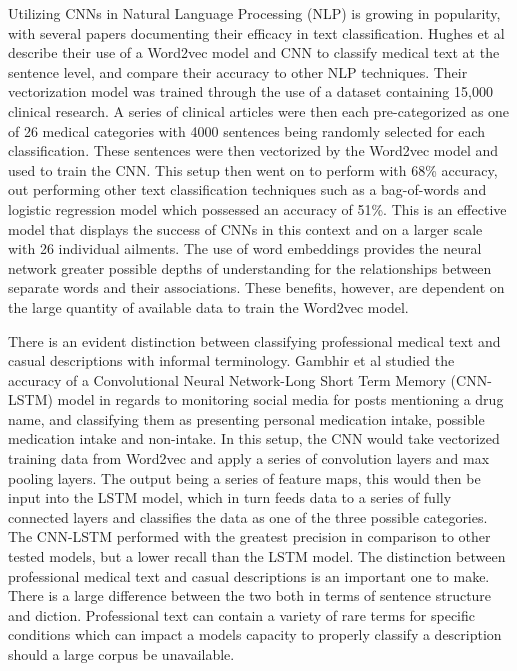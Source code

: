 \documentclass[12pt]{report}
\begin{document}
Utilizing CNNs in Natural Language Processing (NLP) is growing in popularity,
with several papers documenting their efficacy in text classification. Hughes
et al describe their use of a Word2vec model and CNN to classify medical text
at the sentence level, and compare their accuracy to other NLP techniques.
Their vectorization model was trained through the use of a dataset containing
15,000 clinical research. A series of clinical articles were then each
pre-categorized as one of 26 medical categories with 4000 sentences being
randomly selected for each classification. These sentences were then vectorized
by the Word2vec model and used to train the CNN. This setup then went on to
perform with 68\% accuracy, out performing other text classification techniques
such as a bag-of-words and logistic regression model which possessed an
accuracy of 51\%. This is an effective model that displays the success of CNNs
in this context and on a larger scale with 26 individual ailments. The use of
word embeddings provides the neural network greater possible depths of
understanding for the relationships between separate words and their
associations. These benefits, however, are dependent on the large quantity of
available data to train the Word2vec model.

There is an evident distinction between classifying professional medical text
and casual descriptions with informal terminology. Gambhir et al studied the
accuracy of a Convolutional Neural Network-Long Short Term Memory (CNN-LSTM)
model in regards to monitoring social media for posts mentioning a drug name,
and classifying them as presenting personal medication intake, possible
medication intake and non-intake. In this setup, the CNN would take
vectorized training data from Word2vec and apply a series of convolution
layers and max pooling layers. The output being a series of feature maps,
this would then be input into the LSTM model, which in turn feeds data to a
series of fully connected layers and classifies the data as one of the three
possible categories. The CNN-LSTM performed with the greatest precision in
comparison to other tested models, but a lower recall than the LSTM model.
The distinction between professional medical text and casual descriptions is
an important one to make. There is a large difference between the two both in
terms of sentence structure and diction. Professional text can contain a
variety of rare terms for specific conditions which can impact a models
capacity to properly classify a description should a large corpus be
unavailable.
\end{document}
